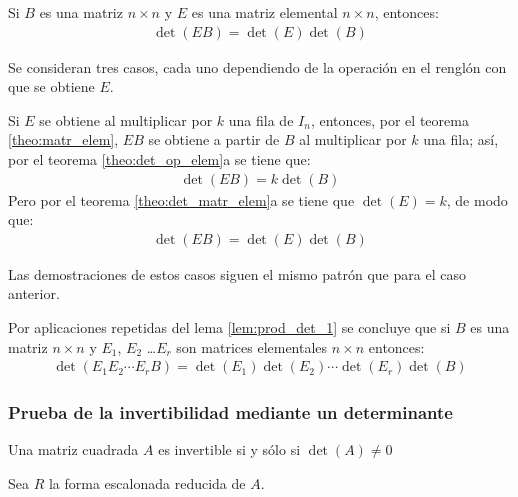 \documentclass[a4paper,12pt]{article}
\begin{document}
\begin{lemma}
  Si $B$ es una matriz $n\times n$ y $E$ es una matriz elemental $n\times n$,
  entonces:
  \begin{align*}
    \det(EB)=\det(E)\det(B)
  \end{align*}
  \label{lem:prod_det_1}
\end{lemma}

\demo Se consideran tres casos, cada uno dependiendo de la operación en el
renglón con que se obtiene $E$.

 Si $E$ se obtiene al multiplicar por $k$ una fila de $I_n$, entonces,
por el teorema \ref{theo:matr_elem}, $EB$ se obtiene a partir de $B$ al
multiplicar por $k$ una fila; así, por el teorema \ref{theo:det_op_elem}a se
tiene que:
\begin{align*}
  \det(EB)=k\det(B)
\end{align*}
Pero por el teorema \ref{theo:det_matr_elem}a se tiene que $\det(E)=k$, de
modo que:
\begin{align*}
  \det(EB)=\det(E)\det(B)
\end{align*}

 Las demostraciones de estos casos siguen el mismo patrón que para
el caso anterior.

\obse Por aplicaciones repetidas del lema \ref{lem:prod_det_1} se concluye que
si $B$ es una matriz $n\times n$ y $E_1$, $E_2$ \ldots $E_r$ son matrices
elementales $n\times n$ entonces:
\begin{align}
  \det(E_1E_2\cdots E_rB)=\det(E_1)\det(E_2)\cdots\det(E_r)\det(B)
  \label{eq:det_prod_matr}
\end{align}

\subsubsection{Prueba de la invertibilidad mediante un determinante}

\begin{theorem}
  Una matriz cuadrada $A$ es invertible si y sólo si $\det(A)\ne0$
  \label{theo:proof_inv_matr}
\end{theorem}

\demo Sea $R$ la forma escalonada reducida de $A$.
\end{document}
